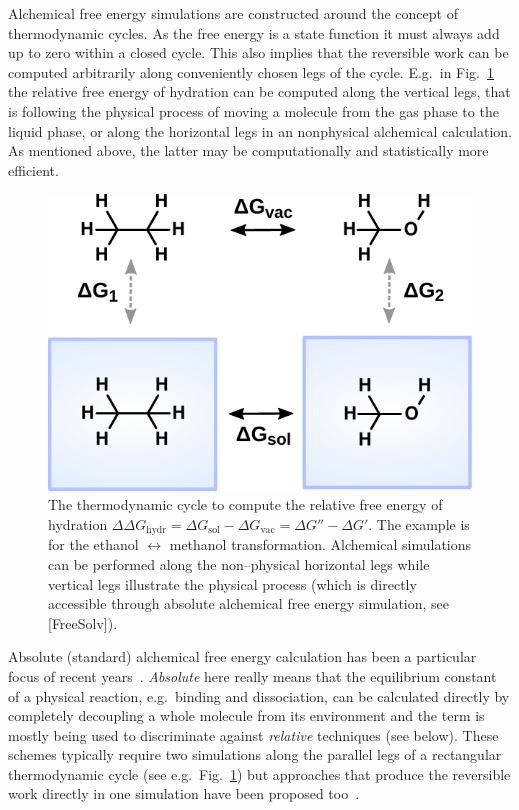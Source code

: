 \documentclass[journal=jctcce,manuscript=article]{achemso}
\begin{document}
Alchemical free energy simulations are constructed around the concept
of thermodynamic cycles.  As the free energy is a state function it
must always add up to zero within a closed cycle.  This also implies
that the reversible work can be computed arbitrarily along
conveniently chosen legs of the cycle.  E.g.\ in
Fig.~\ref{fig:thermocycle} the relative free energy of hydration can
be computed along the vertical legs, that is following the physical
process of moving a molecule from the gas phase to the liquid phase,
or along the horizontal legs in an nonphysical alchemical calculation.
As mentioned above, the latter may be computationally and
statistically more efficient.

\begin{figure}[ht]
\includegraphics[scale=1.0]{figures/thermocycle.pdf}
\caption{The thermodynamic cycle to compute the relative free energy
  of hydration
  $\Delta\Delta G_{\mathrm{hydr}}=\Delta G_{\mathrm{sol}}-\Delta
  G_{\mathrm{vac}}=\Delta G'' - \Delta G'$.  The
  example is for the ethanol $\leftrightarrow$ methanol
  transformation.  Alchemical simulations can be performed along the
  non--physical horizontal legs while vertical legs illustrate the
  physical process (which is directly accessible through absolute
  alchemical free energy simulation, see [FreeSolv]).}
\label{fig:thermocycle}
\end{figure}

Absolute (standard) alchemical free energy calculation has been a
particular focus of recent years~\cite{GILSON19971047,
  doi:10.1021/jp0217839, deng_computations_2009,
  ytreberg_comparison_2006, doi:10.1021/ct500964e}.  \emph{Absolute}
here really means that the equilibrium constant of a physical
reaction, e.g.\ binding and dissociation, can be calculated directly
by completely decoupling a whole molecule from its environment and the
term is mostly being used to discriminate against \emph{relative}
techniques (see below).  These schemes typically require two
simulations along the parallel legs of a rectangular thermodynamic
cycle (see e.g.\ Fig.~\ref{fig:thermocycle}) but approaches that
produce the reversible work directly in one simulation have been
proposed too~\cite{doi:10.1063/1.3519057, C3FD00125C}.
\end{document}
